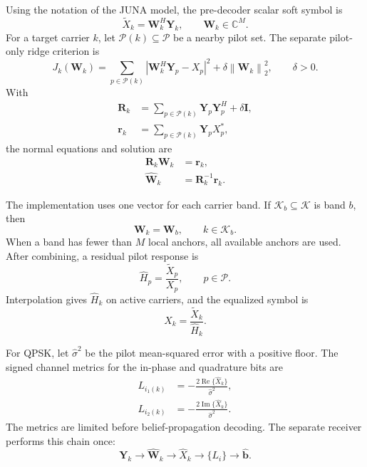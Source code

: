 \documentclass[conference]{IEEEtran}
\newcommand{\C}{\mathbb{C}}
\newcommand{\norm}[1]{\left\lVert #1\right\rVert}
\newcommand{\Pset}{\mathcal{P}}
\newcommand{\Kset}{\mathcal{K}}
\begin{document}
Using the notation of the JUNA model, the pre-decoder scalar soft symbol is
\begin{equation}
  \widetilde X_k
  =
  \mathbf W_k^H\mathbf Y_k,
  \qquad
  \mathbf W_k\in\C^M .
  \label{eq:scalar-combiner}
\end{equation}
For a target carrier \(k\), let \(\Pset(k)\subseteq\Pset\) be a nearby pilot
set.  The separate pilot-only ridge criterion is
\begin{equation}
  J_k(\mathbf W_k)
  =
  \sum_{p\in\Pset(k)}
  \left|\mathbf W_k^H\mathbf Y_p-X_p\right|^2
  +
  \delta\norm{\mathbf W_k}_2^2,
  \qquad \delta>0 .
  \label{eq:rpc-objective}
\end{equation}
With
\begin{align}
  \mathbf R_k
  &=
  \sum_{p\in\Pset(k)}
  \mathbf Y_p\mathbf Y_p^H+\delta\mathbf I,
  \label{eq:rpc-correlation}\\
  \mathbf r_k
  &=
  \sum_{p\in\Pset(k)}
  \mathbf Y_pX_p^*,
  \label{eq:rpc-cross}
\end{align}
the normal equations and solution are
\begin{align}
  \mathbf R_k\mathbf W_k
  &=
  \mathbf r_k,
  \label{eq:rpc-normal}\\
  \widehat{\mathbf W}_k
  &=
  \mathbf R_k^{-1}\mathbf r_k.
  \label{eq:rpc-solution}
\end{align}

The implementation uses one vector for each carrier band.  If
\(\Kset_b\subseteq\Kset\) is band \(b\), then
\begin{equation}
  \mathbf W_k=\mathbf W_b,
  \qquad k\in\Kset_b .
  \label{eq:band-sharing}
\end{equation}
When a band has fewer than \(M\) local anchors, all available anchors are used.
After combining, a residual pilot response is
\begin{equation}
  \widehat H_p
  =
  \frac{\widetilde X_p}{X_p},
  \qquad p\in\Pset .
  \label{eq:pilot-response}
\end{equation}
Interpolation gives \(\widehat H_k\) on active carriers, and the equalized
symbol is
\begin{equation}
  \widehat X_k
  =
  \frac{\widetilde X_k}{\widehat H_k}.
  \label{eq:residual-equalization}
\end{equation}

For QPSK, let \(\widehat{\sigma}^2\) be the pilot mean-squared error with a
positive floor.  The signed channel metrics for the in-phase and quadrature
bits are
\begin{align}
  L_{i_1(k)}
  &=
  -\frac{2\operatorname{Re}\{\widehat X_k\}}
  {\widehat{\sigma}^2},
  \label{eq:qpsk-metric-real}\\
  L_{i_2(k)}
  &=
  -\frac{2\operatorname{Im}\{\widehat X_k\}}
  {\widehat{\sigma}^2}.
  \label{eq:qpsk-metric-imag}
\end{align}
The metrics are limited before belief-propagation decoding.  The separate
receiver performs this chain once:
\[
  \mathbf Y_k
  \longrightarrow
  \widehat{\mathbf W}_k
  \longrightarrow
  \widehat X_k
  \longrightarrow
  \{L_i\}
  \longrightarrow
  \widehat{\mathbf b}.
\]
\end{document}

